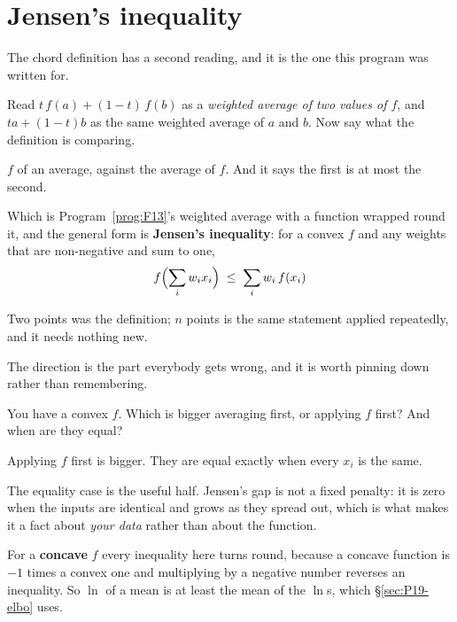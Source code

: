 \section{Jensen's inequality}
\label{sec:P19-jensen}

\begin{fr}
The chord definition has a second reading, and it is the one this program was
written for.

Read $t\,f(a) + (1-t)\,f(b)$ as a \emph{weighted average of two values of
$f$}, and $t a + (1-t) b$ as the same weighted average of $a$ and $b$. Now say
what the definition is comparing.
\dotline
\nextframe
\end{fr}

\begin{fr}
\begin{ansblock}
$f$ of an average, against the average of $f$. And it says the first is at
most the second.
\end{ansblock}

Which is Program~\ref{prog:F13}'s weighted average with a function wrapped
round it, and the general form is \textbf{Jensen's inequality}: for a convex
$f$ and any weights that are non-negative and sum to one,
\[ f\Bigl(\sum_i w_i x_i\Bigr) \;\le\; \sum_i w_i\, f(x_i) \]

Two points was the definition; $n$ points is the same statement applied
repeatedly, and it needs nothing new.
\end{fr}

\begin{fr}
The direction is the part everybody gets wrong, and it is worth pinning down
rather than remembering.

You have a convex $f$. Which is bigger \dash{} averaging first, or applying
$f$ first? And when are they equal?
\nextframe
\end{fr}

\begin{fr}
\begin{ansblock}
Applying $f$ first is bigger. They are equal exactly when every $x_i$ is the
same.
\end{ansblock}

The equality case is the useful half. Jensen's gap is not a fixed penalty: it
is zero when the inputs are identical and grows as they spread out, which is
what makes it a fact about \emph{your data} rather than about the function.

\begin{note}
For a \textbf{concave} $f$ every inequality here turns round, because a
concave function is $-1$ times a convex one and multiplying by a negative
number reverses an inequality. So $\ln$ of a mean is at least the mean of the
$\ln$s, which \S\ref{sec:P19-elbo} uses.
\end{note}
\end{fr}

